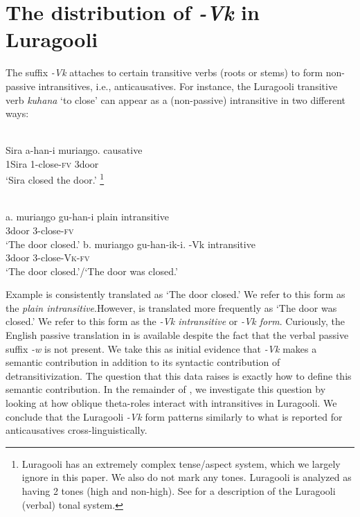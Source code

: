\documentclass[output=paper]{langsci/langscibook}
\begin{document}
\section{The distribution of \textit{-Vk} in Luragooli}

The suffix \textit{-Vk} attaches to certain transitive verbs (roots or stems) to form non-passive intransitives, i.e., anticausatives. For instance, the Luragooli transitive verb \textit{kuhana} ‘to close’ can appear as a (non-passive) intransitive in two different ways:

\ea\label{exx:}
\ea
{}\\
\gll Sira    a-han-i      muriaŋgo.      causative\\
     1Sira 1-close-\textsc{fv}  3door\\
\glt ‘Sira closed the door.’
\footnote{ Luragooli has an extremely complex tense/aspect system, which we largely ignore in this paper. We also do not mark any tones. Luragooli is analyzed as having 2 tones (high and non-high). See \citet{SamuelsPaster2015} for a description of the Luragooli (verbal) tonal system.}
\z
\z

\ea\label{exx:}
{}\\
\ea
\gll a. muriaŋgo gu-han-i        plain intransitive\\
       3door       3-close-\textsc{fv}\\
\glt ‘The door closed.’
\ex
\gll b. muriaŋgo gu-han-ik-i.      -\textup{Vk} intransitive\\
       3door         3-close-\textsc{Vk}-\textsc{fv}\\
\glt ‘The door closed.’/‘The door was closed.’
\z
\z

Example  is consistently translated as ‘The door closed.’ We refer to this form as the \textit{plain intransitive}.However,  is translated more frequently as ‘The door was closed.’ We refer to this form as the \textit{-Vk intransitive} or \textit{-Vk form}. Curiously, the English passive translation in  is available despite the fact that the verbal passive suffix \textit{-w }is not present. We take this as initial evidence that \textit{-Vk} makes a semantic contribution in addition to its syntactic contribution of detransitivization. The question that this data raises is exactly how to define this semantic contribution.\textit{ }In the remainder of , we investigate this question by looking at how oblique theta-roles interact with intransitives in Luragooli. We conclude that the Luragooli \textit{-Vk} form patterns similarly to what is reported for anticausatives cross-linguistically.
\end{document}
